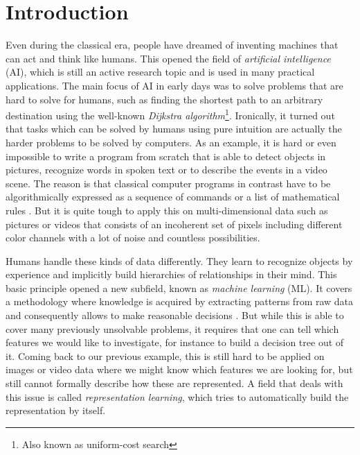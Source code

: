 

\chapter{Introduction} \label{chapter:introduction}

Even during the classical era, people have dreamed of inventing machines that can act and think like humans. This opened the field of \textit{artificial intelligence} (AI), which is still an active research topic and is used in many practical applications. The main focus of AI in early days was to solve problems that are hard to solve for humans, such as finding the shortest path to an arbitrary destination using the well-known \textit{Dijkstra algorithm}\footnote{Also known as uniform-cost search}. Ironically, it turned out that tasks which can be solved by humans using pure intuition are actually the harder problems to be solved by computers. As an example, it is hard or even impossible to write a program from scratch that is able to detect objects in pictures, recognize words in spoken text or to describe the events in a video scene. The reason is that classical computer programs in contrast have to be algorithmically expressed as a sequence of commands or a list of mathematical rules \parencite{deep_learning}. But it is quite tough to apply this on multi-dimensional data such as pictures or videos that consists of an incoherent set of pixels including different color channels with a lot of noise and countless possibilities. 

Humans handle these kinds of data differently. They learn to recognize objects by experience and implicitly build hierarchies of relationships in their mind. This basic principle opened a new subfield, known as \textit{machine learning} (ML). It covers a methodology where knowledge is acquired by extracting patterns from raw data and consequently allows to make reasonable decisions \parencite{deep_learning}. But while this is able to cover many previously unsolvable problems, it requires that one can tell which features we would like to investigate, for instance to build a decision tree out of it. Coming back to our previous example, this is still hard to be applied on images or video data where we might know which features we are looking for, but still cannot formally describe how these are represented. A field that deals with this issue is called \textit{representation learning}, which tries to automatically build the representation by itself.

